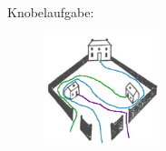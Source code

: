 Knobelaufgabe:

\begin{figure}[ht]
	\centering
	\includegraphics[width=0.3\textwidth]{../pool/ex-graph-theory-1-img-b.png}
	\label{knobel}
\end{figure}

